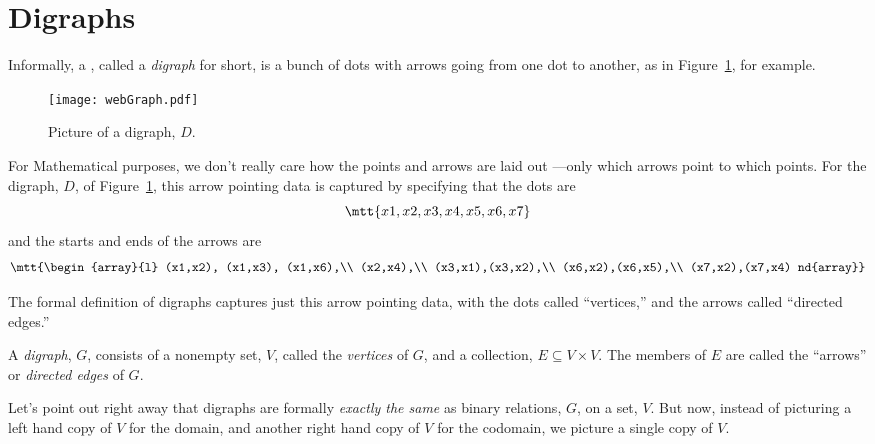 
\section{Digraphs} 

Informally, a , called a \emph{digraph} for short, is
a bunch of dots with arrows going from one dot to another, as in
Figure~\ref{picdigraphg}, for example.

\begin{figure}[htbp]
\texttt{[image: webGraph.pdf]}
\caption{Picture of a digraph, $D$.}
\label{picdigraphg}
\end{figure}



For Mathematical purposes, we don't really care how the points and arrows
are laid out ---only which arrows point to which points.  For the digraph,
$D$, of Figure~\ref{picdigraphg}, this arrow pointing data is captured by
specifying that the dots are
\[
\mtt{x1,x2,x3,x4,x5,x6,x7}
\]
and the starts and ends of the arrows are
\[\mtt{\begin{array}{l}
(x1,x2), (x1,x3), (x1,x6),\\
(x2,x4),\\
(x3,x1),(x3,x2),\\
(x6,x2),(x6,x5),\\
(x7,x2),(x7,x4)
nd{array}}\]

The formal definition of digraphs captures just this arrow pointing data,
with the dots called ``vertices,'' and the arrows called ``directed edges.''

\begin{definition}\label{graphdef} 
  A \emph{digraph}, $G$, consists of a nonempty set, $V$, called the
  \emph{vertices} of $G$, and a collection, $E \subseteq V \times V$.  The
  members of $E$ are called the ``arrows'' or \emph{directed edges} of
  $G$.
\end{definition}

Let's point out right away that digraphs are formally \emph{exactly the
  same} as binary relations, $G$, on a set, $V$.  But now, instead of
picturing a left hand copy of $V$ for the domain, and another right hand
copy of $V$ for the codomain, we picture a single copy of $V$.

